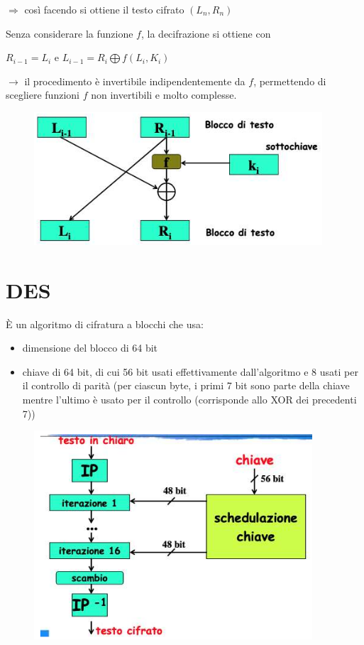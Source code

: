 $\Rightarrow$ così facendo si ottiene il testo cifrato $(L_n, R_n)$

\newpage
\noindent Senza considerare la funzione $f$, la decifrazione si ottiene con 

\begin{center}
    $R_{i-1} = L_i$ e $L_{i-1} = R_i \bigoplus f(L_i, K_i)$
\end{center}

\noindent $\rightarrow$ il procedimento è invertibile indipendentemente da $f$, permettendo di scegliere funzioni $f$ non invertibili 
e molto complesse.

\begin{figure}[H]
    \centering
    \includegraphics[width=0.7\linewidth]{chapters/chap4/images/feistel.png}
\end{figure}



\section{DES}

È un algoritmo di cifratura a blocchi che usa:
\begin{itemize}
    \item dimensione del blocco di 64 bit 
    \item chiave di 64 bit, di cui 56 bit usati effettivamente dall'algoritmo e 8 usati per il controllo di parità (per ciascun byte, 
    i primi 7 bit sono parte della chiave mentre l'ultimo è usato per il controllo (corrisponde allo XOR dei precedenti 7))
\end{itemize}

\begin{figure}[H]
    \centering
    \includegraphics[width=0.7\linewidth]{chapters/chap4/images/des.png}
\end{figure}

